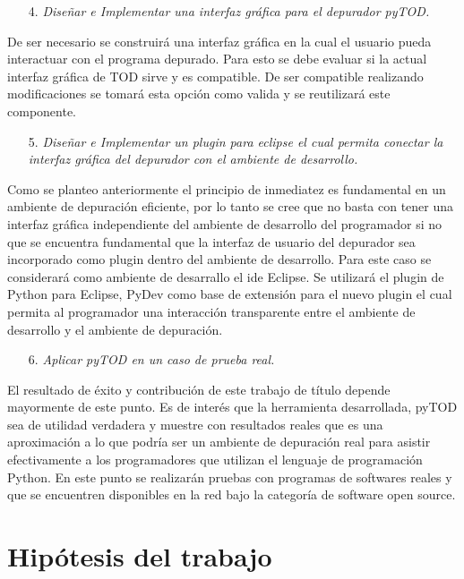 \documentclass[12pt,legalpaper]{report}
\begin{document}
\begin{itemize}
\item[4.] \textit{Diseñar e Implementar una interfaz gráfica para el depurador pyTOD.}
\end{itemize}

De ser necesario se construirá una interfaz gráfica en la cual el usuario pueda interactuar con el programa depurado.  Para esto se debe evaluar si la actual interfaz gráfica de TOD sirve y es compatible.  De ser compatible realizando modificaciones se tomará esta opción como valida y se reutilizará este componente.

\begin{itemize}
\item[5.] \textit{Diseñar e Implementar un plugin para eclipse el cual permita conectar la interfaz gráfica del depurador con el ambiente de desarrollo.}
\end{itemize}

Como se planteo anteriormente el principio de inmediatez es fundamental en un ambiente de depuración eficiente, por lo tanto se cree que no basta con tener una interfaz gráfica independiente del ambiente de desarrollo del programador si no que se encuentra fundamental que la interfaz de usuario del depurador sea incorporado como plugin dentro del ambiente de desarrollo.  Para este caso se considerará como ambiente de desarrallo el ide Eclipse.  Se utilizará el plugin de Python para Eclipse, PyDev como base de extensión para el nuevo plugin el cual permita al programador una interacción transparente entre el ambiente de desarrollo y el ambiente de depuración.


\begin{itemize}
\item[6.] \textit{Aplicar pyTOD en un caso de prueba real.}
\end{itemize}

El resultado de éxito y contribución de este trabajo de título depende mayormente de este punto.  Es de interés que la herramienta desarrollada, pyTOD sea de utilidad verdadera y muestre con resultados reales que es una aproximación a lo que podría ser un ambiente de depuración real para asistir efectivamente a los programadores que utilizan el lenguaje de programación Python.  En este punto se realizarán pruebas con programas de softwares reales y que se encuentren disponibles en la red bajo la categoría de software open source.


	\section{Hipótesis del trabajo}
\end{document}
